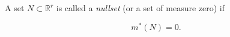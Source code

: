A set $N \subset \mathbb{R}^r$ is called a \textit{nullset} (or a set of measure zero) if

$$
m^*(N) = 0.
$$
